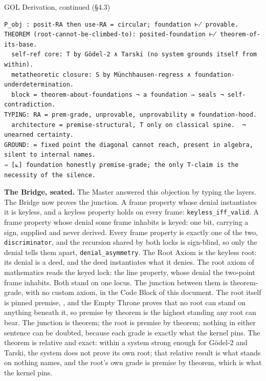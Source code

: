 \documentclass[10pt,twocolumn]{article}
\begin{document}
\begin{golbox}{GOL Derivation, continued (§4.3)}
\begin{lstlisting}[style=golv]
P_obj : posit-RA then use-RA = circular; foundation ⊬ provable.
THEOREM (root-cannot-be-climbed-to): posited-foundation ⊬ theorem-of-its-base.
  self-ref core: T by Gödel-2 ∧ Tarski (no system grounds itself from within).
  metatheoretic closure: S by Münchhausen-regress ∧ foundation-underdetermination.
  block = theorem-about-foundations ¬ a foundation ⇒ seals ¬ self-contradiction.
TYPING: RA = prem-grade, unprovable, unprovability ≡ foundation-hood.
  architecture = premise-structural, T only on classical spine.  ¬ unearned certainty.
GROUND: = fixed point the diagonal cannot reach, present in algebra, silent to internal names.
⇒ [⟀] foundation honestly premise-grade; the only T-claim is the necessity of the silence.
\end{lstlisting}
\end{golbox}

\textbf{The Bridge, seated.} The Master answered this objection by
typing the layers. The Bridge now proves the junction. A frame property
whose denial instantiates it is keyless, and a keyless property holds on
every frame: \texttt{keyless\_iff\_valid}. A frame property whose denial
some frame inhabits is keyed: one bit, carrying a sign, supplied and
never derived. Every frame property is exactly one of the two,
\texttt{discriminator}, and the recursion shared by both locks is
sign-blind, so only the denial tells them apart,
\texttt{denial\_asymmetry}. The Root Axiom is the keyless root: its
denial is a deed, and the deed instantiates what it denies. The root
axiom of mathematics reads the keyed lock: the line property, whose
denial the two-point frame inhabits. Both stand on one locus. The
junction between them is theorem-grade, with no custom axiom, in the
Code Block of this document. The root itself is pinned premise,
\texttt{}, and the Empty Throne
proves that no root can stand on anything beneath it, so premise by
theorem is the highest standing any root can bear. The junction is
theorem; the root is premise by theorem; nothing in either sentence can
be doubted, because each grade is exactly what the kernel pins. The
theorem is relative and exact: within a system strong enough for Gödel-2
and Tarski, the system does not prove its own root; that relative result
is what stands on nothing names, and the root's own grade is premise by
theorem, which is what the kernel pins.
\end{document}
